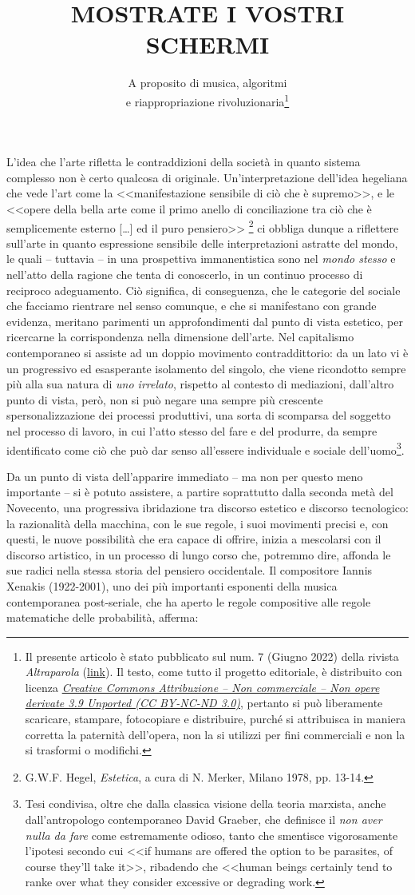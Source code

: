 \documentclass[a4paper,12pt]{scrartcl}
\title{\LARGE{MOSTRATE I VOSTRI SCHERMI}}
\author{}
\subtitle{A proposito di musica, algoritmi \\ e riappropriazione rivoluzionaria\footnote{Il presente articolo è stato pubblicato sul num. 7 (Giugno 2022) della rivista \emph{Altraparola} (\href{https://www.altraparolarivista.it/}{link}). Il testo, come tutto il progetto editoriale, è distribuito con licenza \href{https://creativecommons.org/licenses/by-nc-nd/3.0/deed.it}{\textit{Creative Commons Attribuzione -- Non commerciale -- Non opere derivate 3.9 Unported (CC BY-NC-ND 3.0)}}, pertanto si può liberamente scaricare, stampare, fotocopiare e distribuire, purché si attribuisca in maniera corretta la paternità dell'opera, non la si utilizzi per fini commerciali e non la si trasformi o modifichi.}}
\date{}
\newcommand{\omissis}{[\dots\unkern]}
\begin{document}
	
	\maketitle
	
	
	L'idea che l'arte rifletta le contraddizioni della società in quanto sistema complesso non è certo qualcosa di originale. Un'interpretazione dell'idea hegeliana che vede l'art come la <<manifestazione sensibile di ciò che è supremo>>, e le <<opere della bella arte come il primo anello di conciliazione tra ciò che è semplicemente esterno \omissis{} ed il puro pensiero>> 
	\footnote{G.W.F. Hegel, \emph{Estetica}, a cura di N. Merker, Milano 1978, pp. 13-14.} ci obbliga dunque a riflettere sull'arte in quanto espressione sensibile delle interpretazioni astratte del mondo, le quali -- tuttavia -- in una prospettiva immanentistica sono nel \emph{mondo stesso} e nell'atto della ragione che tenta di conoscerlo, in un continuo processo di reciproco adeguamento. Ciò significa, di conseguenza, che le categorie del sociale che facciamo rientrare nel senso comunque, e che si manifestano con grande evidenza, meritano parimenti un approfondimenti dal punto di vista estetico, per ricercarne la corrispondenza nella dimensione dell'arte. Nel capitalismo contemporaneo si assiste ad un doppio movimento contraddittorio: da un lato vi è un progressivo ed esasperante isolamento del singolo, che viene ricondotto sempre più alla sua natura di \emph{uno irrelato}, rispetto al contesto di mediazioni, dall'altro punto di vista, però, non si può negare una sempre più crescente spersonalizzazione dei processi produttivi, una sorta di scomparsa del soggetto nel processo di lavoro, in cui l'atto stesso del fare e del produrre, da sempre identificato come ciò che può dar senso all'essere individuale e sociale dell'uomo\footnote{Tesi condivisa, oltre che dalla classica visione della teoria marxista, anche dall'antropologo contemporaneo David Graeber, che definisce il \emph{non aver nulla da fare} come estremamente odioso, tanto che smentisce vigorosamente l'ipotesi secondo cui <<if humans are offered the option to be parasites, of course they'll take it>>, ribadendo che <<human beings certainly tend to ranke over what they consider excessive or degrading work.}.
	
	Da un punto di vista dell’apparire immediato – ma non per questo meno importante – si è potuto assistere, a partire soprattutto dalla seconda metà del Novecento, una progressiva ibridazione tra discorso estetico e discorso tecnologico: la razionalità della macchina, con le sue regole, i suoi movimenti precisi e, con questi, le nuove possibilità che era capace di offrire, inizia a mescolarsi con il discorso artistico, in un processo di lungo corso che, potremmo dire, affonda le sue radici nella stessa storia del pensiero occidentale. Il compositore Iannis Xenakis (1922-2001), uno dei più importanti esponenti della musica contemporanea post-seriale, che ha aperto le regole compositive alle regole matematiche delle probabilità, afferma:
	
\end{document}
